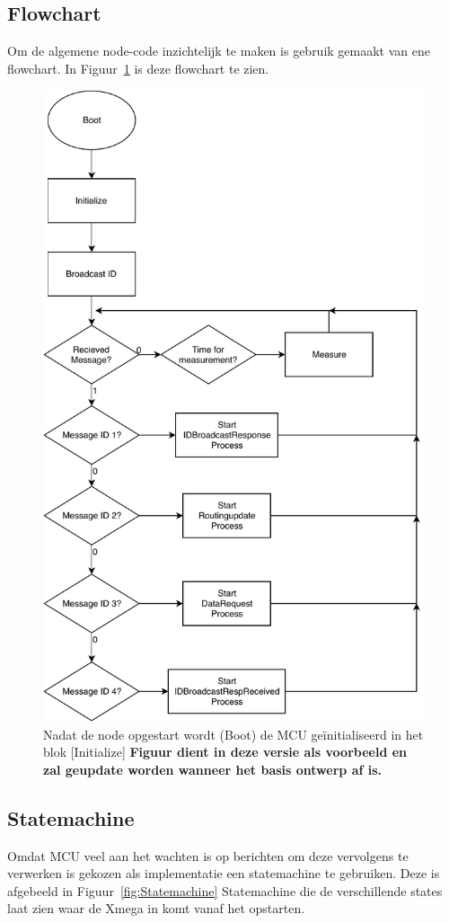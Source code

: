 \documentclass[a4paper, 11pt]{article}
\begin{document}
\subsection{Flowchart}
Om de algemene node-code inzichtelijk te maken is gebruik gemaakt van ene flowchart. In Figuur~\ref{fig:flowchart} is deze flowchart te zien.

\begin{figure}[!h]
	\centering	
	\includegraphics[width=.5\textwidth, keepaspectratio]{media/Pflow.pdf}
    \caption{Nadat de node opgestart wordt (Boot) de MCU geïnitialiseerd in het blok [Initialize]
     \textbf{Figuur dient in deze versie als voorbeeld en zal geupdate worden wanneer het basis ontwerp af is.}}
    \label{fig:flowchart}
\end{figure}

\subsection{Statemachine}
Omdat MCU veel aan het wachten is op berichten om deze vervolgens te verwerken is gekozen als implementatie een statemachine te gebruiken. Deze is afgebeeld in Figuur~\ref{fig:Statemachine} 
Statemachine die de verschillende states laat zien waar de Xmega in komt vanaf het opstarten.
\end{document}
